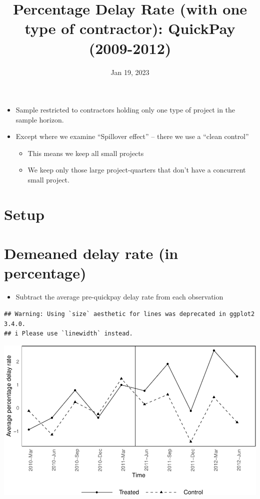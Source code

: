 \documentclass[
]{article}
\title{Percentage Delay Rate (with one type of contractor): QuickPay
(2009-2012)}
\author{}
\date{\vspace{-2.5em}Jan 19, 2023}
\providecommand{\tightlist}{%
  \setlength{\itemsep}{0pt}\setlength{\parskip}{0pt}}
\begin{document}
\maketitle

\begin{itemize}
\tightlist
\item
  Sample restricted to contractors holding only one type of project in
  the sample horizon.
\item
  Except where we examine ``Spillover effect'' -- there we use a ``clean
  control''

  \begin{itemize}
  \tightlist
  \item
    This means we keep all small projects
  \item
    We keep only those large project-quarters that don't have a
    concurrent small project.
  \end{itemize}
\end{itemize}

\hypertarget{setup}{%
\section{Setup}\label{setup}}

\hypertarget{demeaned-delay-rate-in-percentage}{%
\section{Demeaned delay rate (in
percentage)}\label{demeaned-delay-rate-in-percentage}}

\begin{itemize}
\tightlist
\item
  Subtract the average pre-quickpay delay rate from each observation
\end{itemize}

\begin{verbatim}
## Warning: Using `size` aesthetic for lines was deprecated in ggplot2 3.4.0.
## i Please use `linewidth` instead.
\end{verbatim}

\includegraphics{qp_first_pc_delay_one_type_files/figure-latex/demeaned_plot_one_type-1.pdf}
\end{document}
